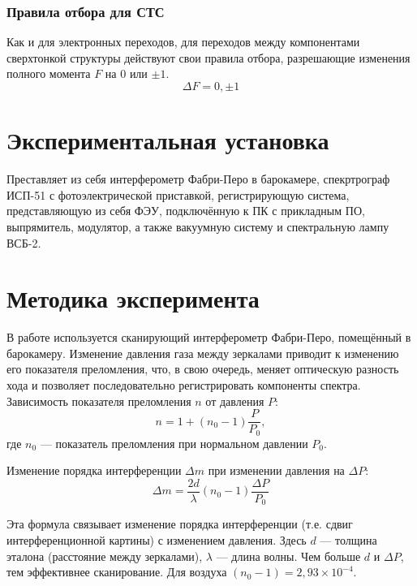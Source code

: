 \documentclass[12pt,a5paper,titlepage, main = russian]{article}
\begin{document}
\subsubsection{Правила отбора для СТС} 
Как и для электронных переходов, для переходов между компонентами сверхтонкой структуры действуют свои правила отбора, разрешающие изменения полного момента \(F\) на 0 или \(\pm 1\).
\begin{equation}
    \Delta F = 0,\pm 1
\end{equation}

\section{Экспериментальная установка}
Преставляет из себя интерферометр Фабри-Перо в барокамере, спекртрограф ИСП-51 с фотоэлектрической приставкой, регистрирующую система, представляющую из себя ФЭУ, подключённую к ПК с прикладным ПО, выпрямитель, модулятор, а также вакуумную систему и спектральную лампу ВСБ-2.


\section{Методика эксперимента}
В работе используется сканирующий интерферометр Фабри-Перо, помещённый в барокамеру. Изменение давления газа между зеркалами приводит к изменению его показателя преломления, что, в свою очередь, меняет оптическую разность хода и позволяет последовательно регистрировать компоненты спектра.
Зависимость показателя преломления \(n\) от давления \(P\):
    \begin{equation}
        n = 1 + (n_0 - 1)\frac{P}{P_0}, 
    \end{equation} 
    где \(n_0\) — показатель преломления при нормальном давлении \(P_0\).
    
Изменение порядка интерференции \(\Delta m\) при изменении давления на \(\Delta P\):
    \begin{equation}
        \Delta m = \frac{2d}{\lambda} (n_0 - 1) \frac{\Delta P}{P_0}
    \end{equation} 
    
Эта формула связывает изменение порядка интерференции (т.е. сдвиг интерференционной картины) с изменением давления. Здесь \(d\) — толщина эталона (расстояние между зеркалами), \(\lambda\) — длина волны. Чем больше \(d\) и \(\Delta P\), тем эффективнее сканирование. Для воздуха \((n_0 - 1) = 2,93 \times 10^{-4}\).
\end{document}
